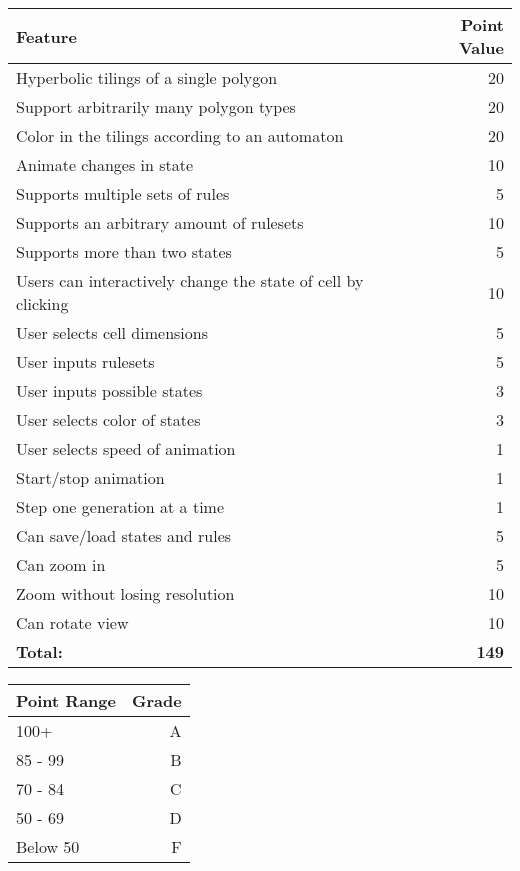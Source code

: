 \documentclass[letterpaper,12pt]{article}
\begin{document}
\begin{center}
  \begin{tabular}{ | l | r | }
    \hline
    \textbf{Feature} & \textbf{Point Value} \\ \hline
    Hyperbolic tilings of a single polygon & 20 \\ \hline
    Support arbitrarily many polygon types & 20 \\ \hline
    Color in the tilings according to an automaton & 20 \\ \hline
    Animate changes in state & 10 \\ \hline
    Supports multiple sets of rules & 5 \\ \hline
	Supports an arbitrary amount of rulesets & 10 \\ \hline
	Supports more than two states & 5 \\ \hline
	Users can interactively change the state of cell by clicking & 10 \\ \hline
	User selects cell dimensions & 5 \\ \hline
	User inputs rulesets & 5 \\ \hline
	User inputs possible states & 3 \\ \hline
	User selects color of states & 3 \\ \hline
	User selects speed of animation & 1 \\ \hline
	Start/stop animation & 1 \\ \hline
	Step one generation at a time & 1 \\ \hline
	Can save/load states and rules & 5 \\ \hline
	Can zoom in & 5 \\ \hline
	Zoom without losing resolution & 10 \\ \hline
	Can rotate view & 10 \\ \hline
	\textbf{Total:} & \textbf{149} \\ \hline

  \end{tabular}
\end{center}

\begin{center}
  \begin{tabular}{ | l | r | }
    \hline
    \textbf{Point Range} & \textbf{Grade} \\ \hline
    100+ & A \\ \hline
    85 - 99 & B \\ \hline
    70 - 84 & C \\ \hline
    50 - 69 & D \\ \hline
    Below 50 & F \\ \hline

  \end{tabular}
\end{center}
\end{document}
